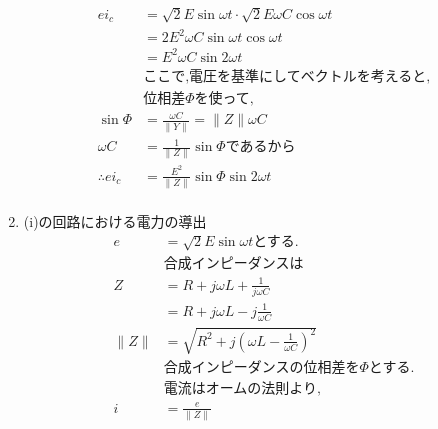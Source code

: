 \documentclass[twocolumn]{article}
\begin{document}
\begin{enumerate}
\begin{align*}
        ei_c  &= \sqrt{2}E\sin\omega t \cdot \sqrt{2}E \omega C  \cos\omega t\\
              &= 2E^2 \omega C \sin\omega t \cos\omega t\\
              &= E^2 \omega C \sin2\omega t\\
              &\text{ここで,電圧を基準にしてベクトルを考えると,}\\
              &\text{位相差}\Phi\text{を使って,}\\
              \sin \Phi &= \frac{\omega C}{\|Y\|} = \|Z\|\omega C\\
              \omega C &= \frac{1}{\|Z\|} \sin \Phi\text{であるから}\\
  \therefore ei_c &= \frac{E^2}{\|Z\|} \sin\Phi \sin2\omega t\\
        \end{align*}
  \item (i)の回路における電力の導出
        \begin{align*}
          e               & = \sqrt{2}E\sin\omega t\text{とする.}                                                                                                       \\
                          & \text{合成インピーダンスは}                                                                                                                        \\
          Z               & = R + j\omega L + \frac{1}{j\omega C}                                                                                                    \\
                          & = R + j\omega L -j \frac{1}{\omega C}                                                                                                    \\
          \|Z\|           & = \sqrt{R^2 + j{\left(\omega L - \frac{1}{\omega C}\right)}^2}                                                                           \\
                          & \text{合成インピーダンスの位相差を}\Phi\text{とする.}                                                                                                     \\
                          & \text{電流はオームの法則より,}                                                                                                                      \\
          i               & = \frac{e}{\|Z\|}                                                                                                                        \\

\end{align*}
\end{enumerate}
\end{document}
